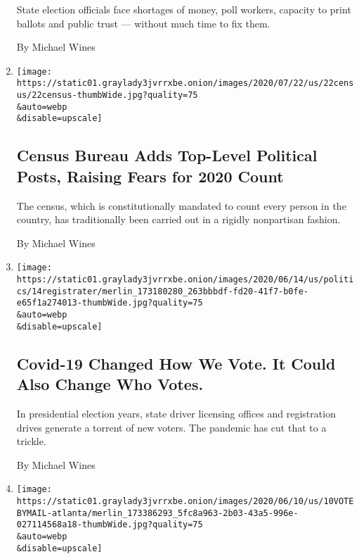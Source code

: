 \begin{enumerate}
  State election officials face shortages of money, poll workers,
  capacity to print ballots and public trust --- without much time to
  fix them.

  By Michael Wines
\item
  \href{/2020/06/23/us/census-bureau-cogley-korzeniewski.html}{}

  \texttt{[image: https://static01.graylady3jvrrxbe.onion/images/2020/07/22/us/22census/22census-thumbWide.jpg?quality=75\\\&auto=webp\\\&disable=upscale]}

  \hypertarget{census-bureau-adds-top-level-political-posts-raising-fears-for-2020-count}{%
  \subsection{Census Bureau Adds Top-Level Political Posts, Raising
  Fears for 2020
  Count}\label{census-bureau-adds-top-level-political-posts-raising-fears-for-2020-count}}

  The census, which is constitutionally mandated to count every person
  in the country, has traditionally been carried out in a rigidly
  nonpartisan fashion.

  By Michael Wines
\item
  \href{/2020/06/14/us/voter-registration-coronavirus-2020-election.html}{}

  \texttt{[image: https://static01.graylady3jvrrxbe.onion/images/2020/06/14/us/politics/14registrater/merlin\_173180280\_263bbbdf-fd20-41f7-b0fe-e65f1a274013-thumbWide.jpg?quality=75\\\&auto=webp\\\&disable=upscale]}

  \hypertarget{covid-19-changed-how-we-vote-it-could-also-change-who-votes}{%
  \subsection{Covid-19 Changed How We Vote. It Could Also Change Who
  Votes.}\label{covid-19-changed-how-we-vote-it-could-also-change-who-votes}}

  In presidential election years, state driver licensing offices and
  registration drives generate a torrent of new voters. The pandemic has
  cut that to a trickle.

  By Michael Wines
\item
  \href{/2020/06/10/us/politics/voting-by-mail-georgia.html}{}

  \texttt{[image: https://static01.graylady3jvrrxbe.onion/images/2020/06/10/us/10VOTEBYMAIL-atlanta/merlin\_173386293\_5fc8a963-2b03-43a5-996e-027114568a18-thumbWide.jpg?quality=75\\\&auto=webp\\\&disable=upscale]}


\end{enumerate}
